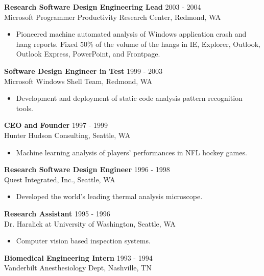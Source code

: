 \begin{resume}
\begin{itemize}
 \end{itemize}

 {\bf Research Software Design Engineering Lead} \hfill 2003 - 2004\\
 Microsoft Programmer Productivity Research Center, Redmond, WA
 \begin{itemize} \itemsep -2pt  %
 \item Pioneered machine automated analysis of Windows application crash and hang reports. Fixed 50\% of the volume of the hangs in IE, Explorer, Outlook, Outlook Express, PowerPoint, and Frontpage.
 \end{itemize}
 
 {\bf Software Design Engineer in Test} \hfill 1999 - 2003\\
 Microsoft Windows Shell Team, Redmond, WA
 \begin{itemize} \itemsep -2pt
 \item Development and deployment of static code analysis pattern recognition tools.
 \end{itemize}
 
 {\bf CEO and Founder} \hfill 1997 - 1999\\
 Hunter Hudson Consulting, Seattle, WA
 \begin{itemize} \itemsep -2pt
 \item Machine learning analysis of players' performances in NFL hockey games.
 \end{itemize}
  
 {\bf Research Software Design Engineer} \hfill 1996 - 1998\\
 Quest Integrated, Inc., Seattle, WA 
 \begin{itemize} \itemsep -2pt  %
 \item Developed the world's leading thermal analysis microscope.
 \end{itemize}

 {\bf Research Assistant} \hfill 1995 - 1996\\
 Dr. Haralick at University of Washington, Seattle, WA
\begin{itemize} \itemsep -2pt  %
\item Computer vision based inspection systems.
\end{itemize}
 
 {\bf Biomedical Engineering Intern} \hfill 1993 - 1994\\
 Vanderbilt Anesthesiology Dept, Nashville, TN


\end{resume}
